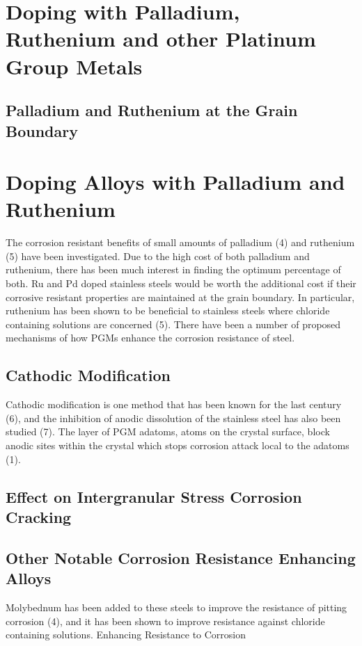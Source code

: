 \section{Doping with Palladium, Ruthenium and other Platinum Group Metals}




\subsection{Palladium and Ruthenium at the Grain Boundary}




\section{Doping Alloys with Palladium and Ruthenium}

The corrosion resistant benefits of small amounts of palladium (4) and ruthenium (5) have been investigated.  Due to the high cost of both palladium and ruthenium, there has been much interest in finding the optimum percentage of both.  Ru and Pd doped stainless steels would be worth the additional cost if their corrosive resistant properties are maintained at the grain boundary.  In particular, ruthenium has been shown to be beneficial to stainless steels where chloride containing solutions are concerned (5).  There have been a number of proposed mechanisms of how PGMs enhance the corrosion resistance of steel.




\subsection{Cathodic Modification}

Cathodic modification is one method that has been known for the last century (6), and the inhibition of anodic dissolution of the stainless steel has also been studied (7).  The layer of PGM adatoms, atoms on the crystal surface, block anodic sites within the crystal which stops corrosion attack local to the adatoms (1).

\subsection{Effect on Intergranular Stress Corrosion Cracking}


\subsection{Other Notable Corrosion Resistance Enhancing Alloys}

Molybednum has been added to these steels to improve the resistance of pitting corrosion (4), and it has been shown to improve resistance against chloride containing solutions. Enhancing Resistance to Corrosion


